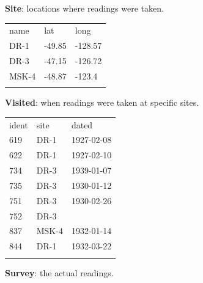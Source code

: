 \documentclass[]{book}
\begin{document}
\textbf{Site}: locations where readings were taken.

\begin{longtable}[c]{@{}lll@{}}
\hline\noalign{\medskip}
name & lat & long
\\\noalign{\medskip}
\hline\noalign{\medskip}
DR-1 & -49.85 & -128.57
\\\noalign{\medskip}
DR-3 & -47.15 & -126.72
\\\noalign{\medskip}
MSK-4 & -48.87 & -123.4
\\\noalign{\medskip}
\hline
\end{longtable}

\textbf{Visited}: when readings were taken at specific sites.

\begin{longtable}[c]{@{}lll@{}}
\hline\noalign{\medskip}
ident & site & dated
\\\noalign{\medskip}
\hline\noalign{\medskip}
619 & DR-1 & 1927-02-08
\\\noalign{\medskip}
622 & DR-1 & 1927-02-10
\\\noalign{\medskip}
734 & DR-3 & 1939-01-07
\\\noalign{\medskip}
735 & DR-3 & 1930-01-12
\\\noalign{\medskip}
751 & DR-3 & 1930-02-26
\\\noalign{\medskip}
752 & DR-3 & ~
\\\noalign{\medskip}
837 & MSK-4 & 1932-01-14
\\\noalign{\medskip}
844 & DR-1 & 1932-03-22
\\\noalign{\medskip}
\hline
\end{longtable}

\textbf{Survey}: the actual readings.
\end{document}
